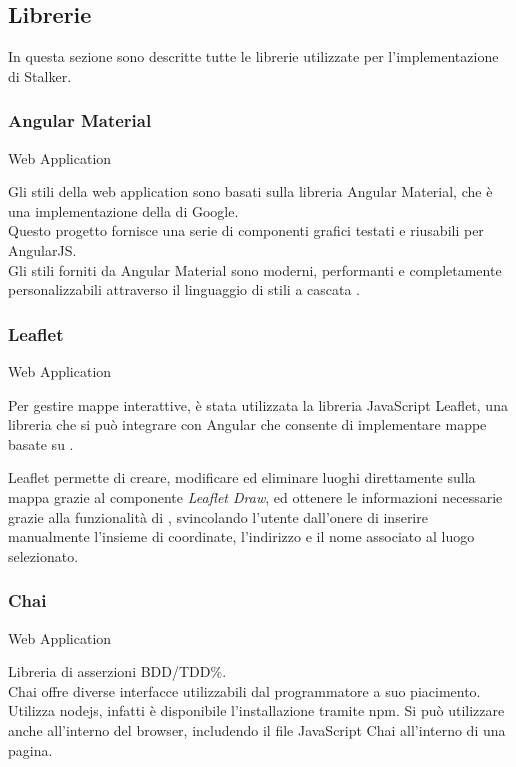 \documentclass[../../../analisi-dei-requisiti.tex]{subfiles}
\begin{document}
\subsection{Librerie}%
\label{sub:librerie}
In questa sezione sono descritte tutte le librerie utilizzate per l'implementazione di Stalker.

\subsubsection{Angular Material}%
\label{subs:angular_material}
Web Application

Gli stili della web application sono basati sulla libreria Angular Material, che è una implementazione della  di Google.\\
Questo progetto fornisce una serie di componenti grafici testati e riusabili per AngularJS\@.\\
Gli stili forniti da Angular Material sono moderni, performanti e completamente personalizzabili attraverso il linguaggio di stili a cascata .

\subsubsection{Leaflet}%
\label{subs:leaflet}
Web Application

Per gestire mappe interattive, è stata utilizzata la libreria JavaScript Leaflet, una libreria che si può integrare con Angular che consente di implementare mappe basate su .

Leaflet permette di creare, modificare ed eliminare luoghi direttamente sulla mappa grazie al componente \textit{Leaflet Draw}, ed ottenere le informazioni necessarie grazie alla funzionalità di , svincolando l'utente dall'onere di inserire manualmente l'insieme di coordinate, l'indirizzo e il nome associato al luogo selezionato.

\subsubsection{Chai}%
\label{subs:chai}
Web Application

Libreria di asserzioni BDD/TDD\%.\\
Chai offre diverse interfacce utilizzabili dal programmatore a suo piacimento.\\
Utilizza nodejs, infatti è disponibile l'installazione tramite npm. Si può utilizzare anche all'interno del browser, includendo il file JavaScript Chai all'interno di una pagina.
\end{document}
